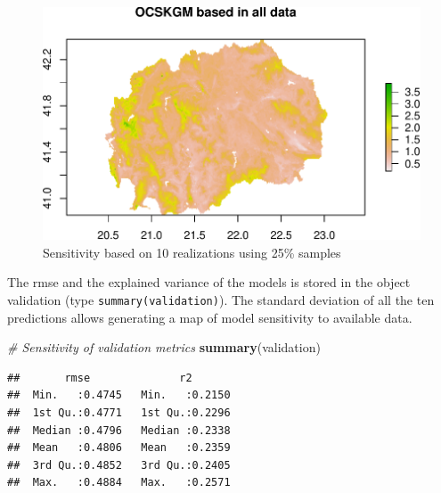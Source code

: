 \documentclass[10pt,b5paper,]{book}
\newenvironment{Shaded}{\begin{snugshade}}{\end{snugshade}}
\newcommand{\CommentTok}[1]{\textcolor[rgb]{0.56,0.35,0.01}{\textit{#1}}}
\newcommand{\DataTypeTok}[1]{\textcolor[rgb]{0.13,0.29,0.53}{#1}}
\newcommand{\DecValTok}[1]{\textcolor[rgb]{0.00,0.00,0.81}{#1}}
\newcommand{\KeywordTok}[1]{\textcolor[rgb]{0.13,0.29,0.53}{\textbf{#1}}}
\newcommand{\NormalTok}[1]{#1}
\newcommand{\OperatorTok}[1]{\textcolor[rgb]{0.81,0.36,0.00}{\textbf{#1}}}
\newcommand{\StringTok}[1]{\textcolor[rgb]{0.31,0.60,0.02}{#1}}
\theoremstyle{definition}
\theoremstyle{definition}
\theoremstyle{definition}
\theoremstyle{remark}
\begin{document}
\begin{Shaded}
\end{Shaded}

\begin{figure}
\centering
\includegraphics{SOCMapping_files/figure-latex/unnamed-chunk-65-1.pdf}
\caption{\label{fig:unnamed-chunk-65}Sensitivity based on 10 realizations
using 25\% samples}
\end{figure}

The rmse and the explained variance of the models is stored in the
object validation (type \texttt{summary(validation)}). The standard
deviation of all the ten predictions allows generating a map of model
sensitivity to available data.

\begin{Shaded}
\begin{Highlighting}[]
\CommentTok{# Sensitivity of validation metrics}
\KeywordTok{summary}\NormalTok{(validation)}
\end{Highlighting}
\end{Shaded}

\begin{verbatim}
##       rmse              r2        
##  Min.   :0.4745   Min.   :0.2150  
##  1st Qu.:0.4771   1st Qu.:0.2296  
##  Median :0.4796   Median :0.2338  
##  Mean   :0.4806   Mean   :0.2359  
##  3rd Qu.:0.4852   3rd Qu.:0.2405  
##  Max.   :0.4884   Max.   :0.2571
\end{verbatim}
\end{document}
